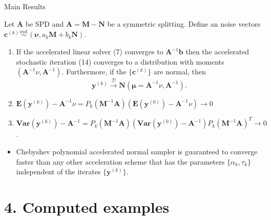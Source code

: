 \documentclass[10pt]{beamer}
\begin{document}
\begin{frame}{Main Results}
    \begin{theorem}
    Let $\mathbf{A}$ be SPD and $\mathbf{A} = \mathbf{M} - \mathbf{N}$ be a symmetric splitting. Define an noise vectors 
    $\mathbf{c}^{(k)} \overset{ind.}{\sim} (\mathbf{\nu}, a_k \mathbf{M} + b_k \mathbf{N})$.
        \begin{enumerate}
            \item If the accelerated linear solver (7) converges to $\mathbf{A}^{-1}\mathbf{b}$
                then the accelerated stochastic iteration (14)
                converges to a distribution with moments $(\mathbf{A}^{-1}\nu, \mathbf{A}^{-1}).$ 
                Furthermore, if the $\{\mathbf{c}^{(k)}\}$ are normal, then
                \begin{equation}
                    \mathbf{y}^{(k)} \overset{\mathcal{D}}{\to} 
                    \mathbf{N}(\mathbf{\mu} = \mathbf{A}^{-1}\nu, \mathbf{A}^{-1}).
                \end{equation}
            \item $\mathbf{E}(\mathbf{y}^{(k)})-\mathbf{A}^{-1}\nu 
            = P_k(\mathbf{M}^{-1}\mathbf{A})(\mathbf{E}(\mathbf{y}^{(0)})-\mathbf{A}^{-1}\nu)
            \to 0$
            \item $\mathbf{Var}(\mathbf{y}^{(k)})-\mathbf{A}^{-1} 
            = P_k(\mathbf{M}^{-1}\mathbf{A})(\mathbf{Var}(\mathbf{y}^{(0)})-\mathbf{A}^{-1})
            P_k(\mathbf{M}^{-1}\mathbf{A})^T \to 0$.
        \end{enumerate}
    \end{theorem}
    \begin{itemize}
        \item Chebyshev polynomial accelerated normal sampler is guaranteed to
        converge faster than any other acceleration scheme that has the parameters 
        $\{ \alpha_k, \tau_k \}$ independent of the iterates $\{\mathbf{y}^{(k)}\}$.
    \end{itemize}
\end{frame}

\section{4. Computed examples}
\end{document}

